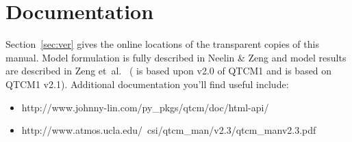 \section{Documentation}

Section~\ref{sec:ver} gives the online locations of the
transparent copies of this manual.  
Model formulation is fully described in
Neelin \& Zeng \cite{Neelin/Zeng:2000} and model
results are described in Zeng et~al.\ \cite{Zeng/etal:2000}
(\cite{Neelin/Zeng:2000} is based upon v2.0 of QTCM1
and \cite{Zeng/etal:2000} is based on QTCM1 v2.1).
Additional documentation you'll find useful include:

\begin{itemize}
\item {}%
{%
        {http://www.johnny-lin.com/py_pkgs/qtcm/doc/html-api/}}

\item {}%
{%
        {http://www.atmos.ucla.edu/~csi/qtcm_man/v2.3/qtcm_manv2.3.pdf}}
\cite{Neelin/etal:2002}

\end{itemize}



